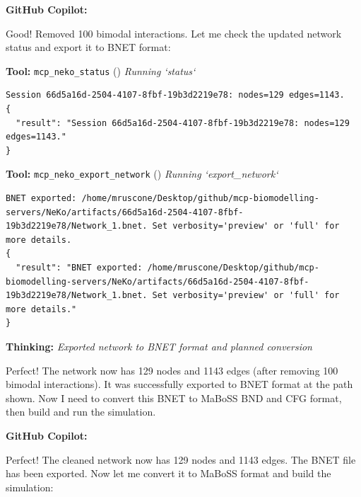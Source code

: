 \documentclass[11pt,a4paper]{article}
\begin{document}
\begin{copilotbox}
\textbf{GitHub Copilot:}

Good! Removed 100 bimodal interactions. Let me check the updated network status and export it to BNET format:

\end{copilotbox}
\begin{toolokbox}
\textbf{Tool:} \texttt{mcp\_neko\_status} (\checkmark)
\textit{Running `status`}
\begin{lstlisting}
Session 66d5a16d-2504-4107-8fbf-19b3d2219e78: nodes=129 edges=1143.
{
  "result": "Session 66d5a16d-2504-4107-8fbf-19b3d2219e78: nodes=129 edges=1143."
}
\end{lstlisting}
\end{toolokbox}
\begin{toolokbox}
\textbf{Tool:} \texttt{mcp\_neko\_export\_network} (\checkmark)
\textit{Running `export\_network`}
\begin{lstlisting}
BNET exported: /home/mruscone/Desktop/github/mcp-biomodelling-servers/NeKo/artifacts/66d5a16d-2504-4107-8fbf-19b3d2219e78/Network_1.bnet. Set verbosity='preview' or 'full' for more details.
{
  "result": "BNET exported: /home/mruscone/Desktop/github/mcp-biomodelling-servers/NeKo/artifacts/66d5a16d-2504-4107-8fbf-19b3d2219e78/Network_1.bnet. Set verbosity='preview' or 'full' for more details."
}
\end{lstlisting}
\end{toolokbox}
\begin{thinkbox}
\textbf{Thinking:} \textit{Exported network to BNET format and planned conversion}

Perfect! The network now has 129 nodes and 1143 edges (after removing 100 bimodal interactions). It was successfully exported to BNET format at the path shown. Now I need to convert this BNET to MaBoSS BND and CFG format, then build and run the simulation.

\end{thinkbox}
\begin{copilotbox}
\textbf{GitHub Copilot:}

Perfect! The cleaned network now has 129 nodes and 1143 edges. The BNET file has been exported. Now let me convert it to MaBoSS format and build the simulation:

\end{copilotbox}
\end{document}
